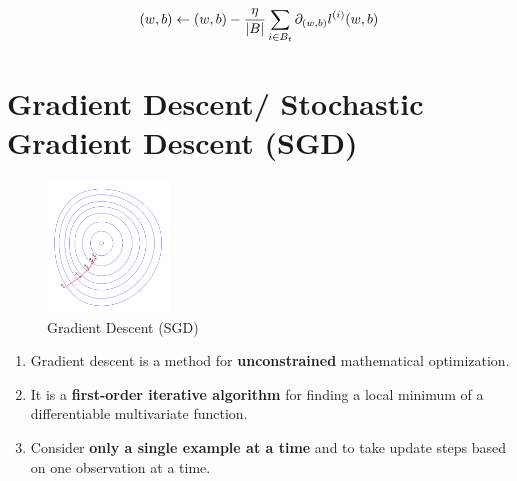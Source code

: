 \[
    \hfill
    (w,b) 
    \leftarrow
    (w,b) - \dfrac{\eta}{\dabs{B}} \dsum_{i \in B_t} 
        \partial_{(w,b)} l^{(i)}(w,b)
    \hfill
\]




\section{Gradient Descent/ Stochastic Gradient Descent (SGD) \cite{wiki-Gradient_descent,wiki-Stochastic_gradient_descent}}\label{Gradient Descent (GD)}\label{Stochastic Gradient Descent (SGD)}

\begin{table}[h]
    \begin{minipage}[t]{0.5\linewidth}
        \begin{figure}[H]
            \centering
            \includegraphics[width=\linewidth, height=3.5cm, keepaspectratio]{Pictures/optimizers/Gradient_descent.jpg}
            \caption{Gradient Descent (SGD)}
        \end{figure}
    \end{minipage}
    \hfill
    \begin{minipage}[t]{0.5\linewidth}
        \begin{enumerate}
            \item Gradient descent is a method for \textbf{unconstrained} mathematical optimization. 
            
            \item It is a \textbf{first-order iterative algorithm} for finding a local minimum of a differentiable multivariate function.

            \item Consider \textbf{only a single example at a time} and to take update steps based on one observation at a time.

        \end{enumerate}        
    \end{minipage}
\end{table}

